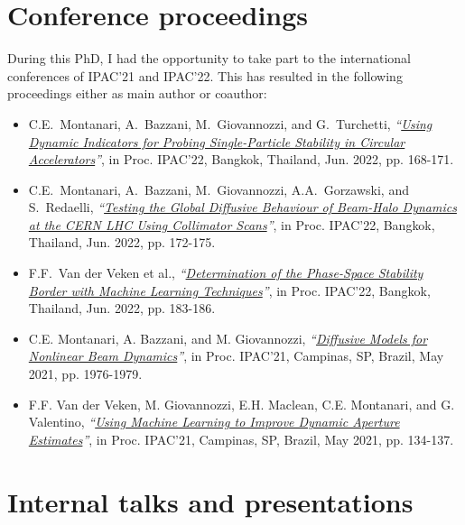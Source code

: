 \section*{Conference proceedings}

During this PhD, I had the opportunity to take part to the international conferences of IPAC'21 and IPAC'22. This has resulted in the following proceedings either as main author or coauthor:
 
\begin{itemize}
    \item C.E.\ Montanari, A.\ Bazzani, M.\ Giovannozzi, and G.\ Turchetti, \textit{``\href{
https://doi.org/10.18429/JACoW-IPAC2022-MOPOST042}{Using Dynamic Indicators for Probing Single-Particle Stability in Circular Accelerators}''}, in Proc. IPAC'22, Bangkok, Thailand, Jun. 2022, pp. 168-171.

    \item C.E.\ Montanari, A.\ Bazzani, M.\ Giovannozzi, A.A.\ Gorzawski, and S.\ Redaelli, \textit{``\href{https://doi.org/10.18429/JACoW-IPAC2022-MOPOST043}{Testing the Global Diffusive Behaviour of Beam-Halo Dynamics at the CERN LHC Using Collimator Scans}''}, in Proc. IPAC'22, Bangkok, Thailand, Jun. 2022, pp. 172-175.

    \item F.F.\ Van der Veken et al., \textit{``\href{https://doi.org/10.18429/JACoW-IPAC2022-MOPOST047}{Determination of the Phase-Space Stability Border with Machine Learning Techniques}''}, in Proc. IPAC'22, Bangkok, Thailand, Jun. 2022, pp. 183-186.

    \item C.E. Montanari, A. Bazzani, and M. Giovannozzi, \textit{``\href{https://doi.org/10.18429/JACoW-IPAC2021-TUPAB233}{Diffusive Models for Nonlinear Beam Dynamics}''}, in Proc. IPAC'21, Campinas, SP, Brazil, May 2021, pp. 1976-1979.

    \item F.F. Van der Veken, M. Giovannozzi, E.H. Maclean, C.E. Montanari, and G. Valentino, \textit{``\href{https://doi.org/10.18429/JACoW-IPAC2021-MOPAB028}{Using Machine Learning to Improve Dynamic Aperture Estimates}''}, in Proc. IPAC'21, Campinas, SP, Brazil, May 2021, pp. 134-137.
\end{itemize}

\section*{Internal talks and presentations}

